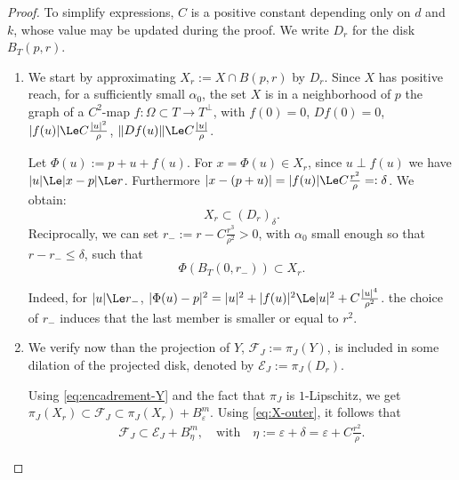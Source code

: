 \begin{proof}
  To simplify expressions, $C$ is a positive constant depending only
  on $d$ and $k$, whose value may be updated during the proof. We
  write $D_r$ for the disk $B_T(p,r)$.
  \begin{enumerate}
  \item We start by approximating $X_r:=X \cap B(p,r)$ by $D_r$. Since
    $X$ has positive reach, for a sufficiently small $\alpha_0$, the
    set $X$ is in a neighborhood of $p$ the graph of a $C^2$-map
    $f:\Omega\subset T\longrightarrow T^\perp$, with $f(0)=0$,
    $Df(0)=0$, $|f(u)|\Le C\frac{|u|^2}{\rho}$, $\|Df(u)\|\Le
    C\frac{|u|}{\rho}$.
    
    Let $\Phi(u):=p+u+f(u)$. For $x=\Phi(u)\in X_r$, since $u\perp
    f(u)$ we have $|u|\Le |x-p| \Le r$. Furthermore
    $|x-(p+u)|=|f(u)| \Le C\frac{r^2}{\rho}=:\delta$. We obtain:
    \begin{equation}
      \label{eq:X-outer}
      X_r\subset (D_r)_\delta.
    \end{equation}
    Reciprocally, we can set $r_-:=r-C\frac{r^3}{\rho^2}>0$, with
    $\alpha_0$ small enough so that $r-r_- \le \delta$, such that
    \begin{equation}
      \label{eq:inner-graph}
      \Phi(B_T(0,r_-))\subset X_r.
    \end{equation}
    
    Indeed, for $|u|\Le r_-$, $|\Phi(u)-p|^2 = |u|^2+|f(u)|^2 \Le
    |u|^2+C\frac{|u|^4}{\rho^2}$. the choice of $r_-$ induces that
    the last member is smaller or equal to $r^2$.
    
  \item We verify now than the projection of $Y$,
    $\mathcal{F}_J:=\pi_J(Y)$, is included in some dilation of the
    projected disk, denoted by $\mathcal{E}_J:=\pi_J(D_r)$.

    Using \eqref{eq:encadrement-Y} and the fact that
    $\pi_J$ is $1$-Lipschitz, we get $\pi_J(X_r) \subset \mathcal{F}_J
    \subset \pi_J(X_r)+B^m_\varepsilon$.
    Using \eqref{eq:X-outer}, it follows that
    \begin{align}
      \label{eq:outer-projection}
      \mathcal{F}_J\subset \mathcal{E}_J+B^m_\eta,
      \quad\text{with}\quad
      \eta:=\varepsilon+\delta
      =
      \varepsilon+C\frac{r^2}{\rho}.
    \end{align}


\end{enumerate}
\end{proof}

